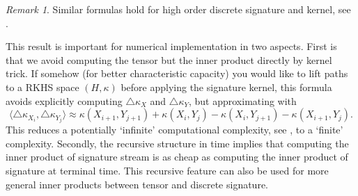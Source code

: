 \documentclass[12pt]{report}
\theoremstyle{definition}
\theoremstyle{remark}
\newtheorem*{remark}{Remark}
\begin{document}
  \begin{remark}
    Similar formulas hold for high order discrete signature and kernel, see \cite{kiraly2019kernels}. 
  \end{remark}
  This result is important for numerical implementation in two aspects. First is that we avoid computing the tensor but the inner product directly by kernel trick. If somehow (for better characteristic capacity) you would like to lift paths to a RKHS space $(H,\kappa)$ before applying the signature kernel, this formula avoids explicitly computing $\triangle\kappa_{X}$ and $\triangle\kappa_{Y}$, but approximating with
    \begin{equation}
      \langle\triangle\kappa_{X_{i}}, \triangle\kappa_{Y_{j}}\rangle\approx\kappa(X_{i+1},Y_{j+1}) + \kappa(X_{i},Y_{j}) - \kappa(X_{i},Y_{j+1}) - \kappa(X_{i+1},Y_{j}).
    \end{equation}
    This reduces a potentially `infinite' computational complexity, see \cite{chevyrev2018signature}, to a `finite' complexity. Secondly, the recursive structure in time implies that computing the inner product of signature stream is as cheap as computing the inner product of signature at terminal time. This recursive feature can also be used for more general inner products between tensor and discrete signature. 
\end{document}
